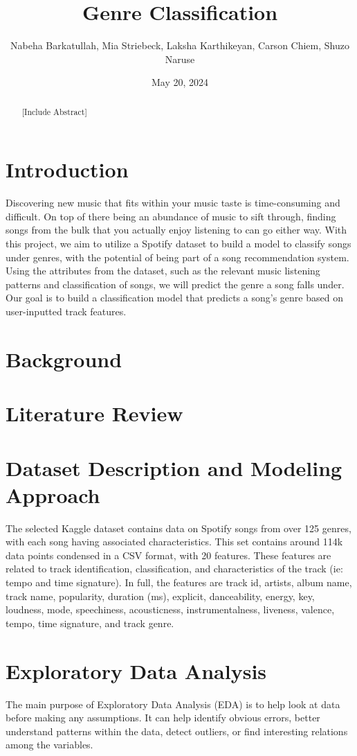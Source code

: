 \documentclass[times, twocolumn]{article}
\title{Genre Classification}
\author{Nabeha Barkatullah, Mia Striebeck, Laksha Karthikeyan, Carson Chiem, Shuzo Naruse}
\date{May 20, 2024}
\begin{document}
\maketitle

\newpage
\begin{abstract}
    [Include Abstract]
\end{abstract}
\section{Introduction}
Discovering new music that fits within your music taste is time-consuming and difficult. On top of there being an abundance of music to sift through, finding songs from the bulk that you actually enjoy listening to can go either way. With this project, we aim to utilize a Spotify dataset to build a model to classify songs under genres, with the potential of being part of a song recommendation system. Using the attributes from the dataset, such as the relevant music listening patterns and classification of songs, we will predict the genre a song falls under. Our goal is to build a classification model that predicts a song’s genre based on user-inputted track features.
\section{Background}
\section{Literature Review}

\section{Dataset Description and Modeling Approach}
The selected Kaggle dataset contains data on Spotify songs from over 125 genres, with each song having associated characteristics. This set contains around 114k data points condensed in a CSV format, with 20 features. These features are related to track identification, classification, and characteristics of the track (ie: tempo and time signature). In full, the features are track id, artists, album name, track name, popularity, duration (ms), explicit, danceability, energy, key, loudness, mode, speechiness, acousticness, instrumentalness, liveness, valence, tempo, time signature, and track genre.

\section{Exploratory Data Analysis}
The main purpose of Exploratory Data Analysis (EDA) is to help look at data before making any assumptions. It can help identify obvious errors, better understand patterns within the data, detect outliers, or find interesting relations among the variables.
\end{document}
